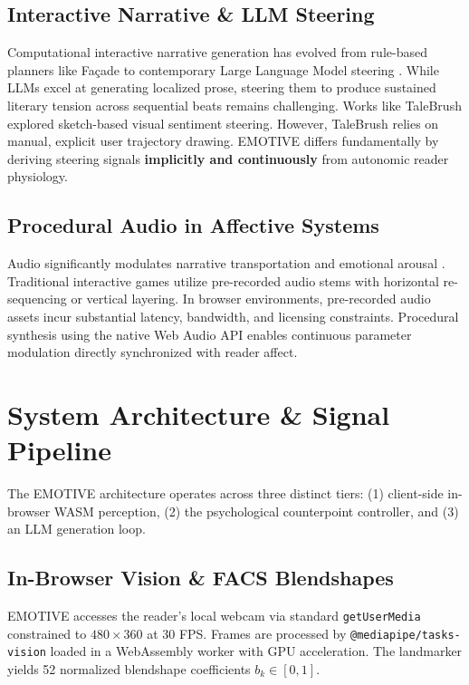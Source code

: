 \documentclass[sigconf,nonacm]{acmart}
\begin{document}
\subsection{Interactive Narrative \& LLM Steering}
Computational interactive narrative generation has evolved from rule-based planners like Fa\c{c}ade \cite{mateas2003facade} to contemporary Large Language Model steering \cite{riedl2010narrative, brown2020language}. While LLMs excel at generating localized prose, steering them to produce sustained literary tension across sequential beats remains challenging. Works like TaleBrush \cite{chung2022talebrush} explored sketch-based visual sentiment steering. However, TaleBrush relies on manual, explicit user trajectory drawing. EMOTIVE differs fundamentally by deriving steering signals \textbf{implicitly and continuously} from autonomic reader physiology.

\subsection{Procedural Audio in Affective Systems}
Audio significantly modulates narrative transportation and emotional arousal \cite{cohen2001music}. Traditional interactive games utilize pre-recorded audio stems with horizontal re-sequencing or vertical layering. In browser environments, pre-recorded audio assets incur substantial latency, bandwidth, and licensing constraints. Procedural synthesis using the native Web Audio API \cite{smus2013web} enables continuous parameter modulation directly synchronized with reader affect.

\section{System Architecture \& Signal Pipeline}

The EMOTIVE architecture operates across three distinct tiers: (1) client-side in-browser WASM perception, (2) the psychological counterpoint controller, and (3) an LLM generation loop.

\subsection{In-Browser Vision \& FACS Blendshapes}

EMOTIVE accesses the reader's local webcam via standard \texttt{getUserMedia} constrained to $480 \times 360$ at 30 FPS. Frames are processed by \texttt{@mediapipe/tasks-vision} loaded in a WebAssembly worker with GPU acceleration. The landmarker yields 52 normalized blendshape coefficients $b_k \in [0, 1]$.
\end{document}
